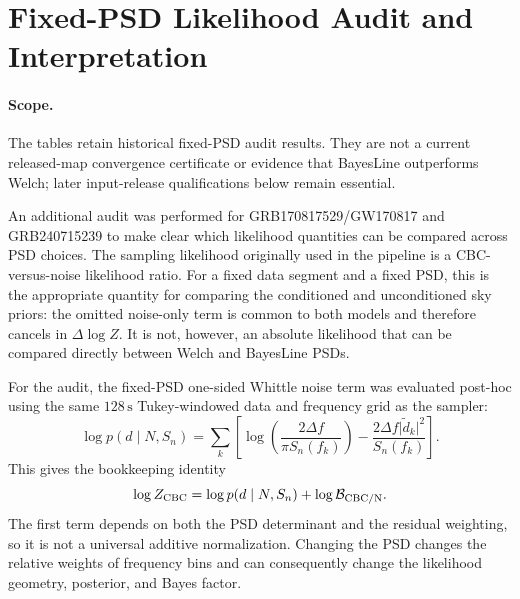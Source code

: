 \section{Fixed-PSD Likelihood Audit and Interpretation}

\paragraph{Scope.}
The tables retain historical fixed-PSD audit results. They are not a current
released-map convergence certificate or evidence that BayesLine outperforms
Welch; later input-release qualifications below remain essential.

An additional audit was performed for GRB170817529/GW170817 and
GRB240715239 to make clear which likelihood quantities can be compared across
PSD choices. The sampling likelihood originally used in the pipeline is a
CBC-versus-noise likelihood ratio. For a fixed data segment and a fixed PSD,
this is the appropriate quantity for comparing the conditioned and
unconditioned sky priors: the omitted noise-only term is common to both
models and therefore cancels in $\Delta\log Z$. It is not, however, an
absolute likelihood that can be compared directly between Welch and BayesLine
PSDs.

For the audit, the fixed-PSD one-sided Whittle noise term was evaluated
post-hoc using the same $128\,\mathrm{s}$ Tukey-windowed data and frequency
grid as the sampler:
\[
\log p(d\mid N,S_n) = \sum_k \left[
\log\!\left(\frac{2\Delta f}{\pi S_n(f_k)}\right)
- \frac{2\Delta f\lvert\tilde d_k\rvert^2}{S_n(f_k)}
\right].
\]
This gives the bookkeeping identity
\[
\log Z_{\rm CBC} = \log p(d\mid N,S_n)
+ \log\mathcal{B}_{\rm CBC/N}.
\]
The first term depends on both the PSD determinant and the residual weighting,
so it is not a universal additive normalization. Changing the PSD changes the
relative weights of frequency bins and can consequently change the likelihood
geometry, posterior, and Bayes factor.

